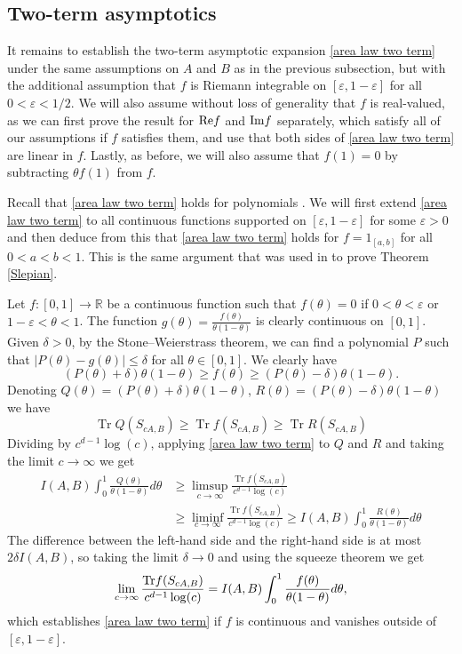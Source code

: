 \documentclass[12pt]{amsart}
\numberwithin{equation}{section}
\newcommand{\R}{\mathbb{R}}
\newcommand{\eps}{\varepsilon}
\begin{document}
\subsection{Two-term asymptotics}
It remains to establish the two-term asymptotic expansion \eqref{area law two term} under the same assumptions on $A$ and $B$ as in the previous subsection, but with the additional assumption that $f$ is Riemann integrable on $[\eps, 1-\eps]$ for all $0<\eps<1/2$. We will also assume without loss of generality that $f$ is real-valued, as we can first prove the result for ${\rm Re}f$ and ${\rm Im}f$ separately, which satisfy all of our assumptions if $f$ satisfies them, and use that both sides of \eqref{area law two term} are linear in $f$. Lastly, as before, we will also assume that $f(1) = 0$ by subtracting $\theta f(1)$ from $f$.

Recall that \eqref{area law two term} holds for polynomials \cite{EE_paper}. We will first extend \eqref{area law two term} to all continuous functions supported on $[\eps, 1-\eps]$ for some $\eps > 0$ and then deduce from this that \eqref{area law two term} holds for $f = 1_{[a,b]}$ for all $0 < a < b < 1$. This is the same argument that was used in \cite{widom_landau} to prove Theorem \ref{Slepian}.

Let $f:[0,1]\to \R$ be a continuous function such that $f(\theta) = 0$ if $0 < \theta < \eps$ or $1-\eps < \theta < 1$. The function $g(\theta) = \frac{f(\theta)}{\theta(1-\theta)}$ is clearly continuous on $[0, 1]$. Given $\delta > 0$, by the Stone--Weierstrass theorem, we can find a polynomial $P$ such that $|P(\theta)-g(\theta)| \le \delta$ for all $\theta\in [0,1]$. We clearly have $$(P(\theta)+\delta)\theta(1-\theta) \ge f(\theta)\ge(P(\theta)-\delta)\theta(1-\theta).$$
Denoting $Q(\theta)=(P(\theta)+\delta)\theta(1-\theta)$, $R(\theta)=(P(\theta)-\delta)\theta(1-\theta)$ we have
\[
\operatorname{Tr} Q(S_{cA,B}) \geq \operatorname{Tr} f(S_{cA,B}) \geq \operatorname{Tr} R(S_{cA,B})
\]
Dividing by $c^{d-1}\log(c)$, applying \eqref{area law two term} to $Q$ and $R$ and taking the limit $c\to \infty$ we get
\begin{align*}
I(A,B)\int_0^1 \frac{Q(\theta)}{\theta(1-\theta)}d\theta &\ge \limsup_{c\to \infty}\frac{\operatorname{Tr} f(S_{cA,B})}{c^{d-1}\log(c)}\\
&\ge \liminf_{c\to\infty} \frac{\operatorname{Tr} f(S_{cA,B})}{c^{d-1}\log(c)}\ge I(A,B)\int_0^1 \frac{R(\theta)}{\theta(1-\theta)}d\theta
\end{align*}
The difference between the left-hand side and the right-hand side is at most $2\delta I(A,B)$, so taking the limit $\delta \to 0$ and using the squeeze theorem we get 
$$\lim_{c\to \infty} \frac{{\rm Tr} f(S_{cA,B})}{c^{d-1}\log(c)} = I(A,B)\int_0^1 \frac{f(\theta)}{\theta(1-\theta)}d\theta,$$
which establishes \eqref{area law two term} if $f$ is continuous and vanishes outside of $[\eps, 1-\eps]$.
\end{document}
